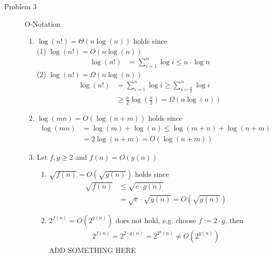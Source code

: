 \documentclass[11pt,a4paper,ngerman]{article}
\begin{document}
\begin{description}
\item[Problem 3] O-Notation
  \begin{enumerate}
    \item $\log(n!) = \Theta(n \log(n))$ holds since\\
          (1) $\log(n!) = O(n \log(n))$ \\
              \begin{equation}\begin{split}
                \log(n!) &= \sum_{i=1}^n {\log i} 
                         \leq n \cdot \log n
              \end{split}\end{equation}
          (2) $\log(n!) = \Omega(n \log(n))$ \\
              \begin{equation}\begin{split}
                \log(n!) &= \sum_{i=1}^n {\log i} \geq \sum_{i=\frac{n}{2}}^n {\log i} \\
                         &\geq \frac{n}{2} \log(\frac{n}{2}) = \Omega(n \log(n))
              \end{split}\end{equation}
    \item $\log(mn) = O(\log(n+m))$ holds since
      \begin{equation}\begin{split}
        \log(mn) &= \log(m) + \log(n) \leq \log(m+n) + \log(n+m)\\
                 &= 2 \log(n+m) = O(\log(n+m))
      \end{split}\end{equation}
  
    \item Let $f,g \geq 2$ and $f(n) = O(g(n))$
    \begin{enumerate}
      \item $\sqrt{f(n)} = O(\sqrt{g(n)})$ holds since
            \begin{equation}\begin{split}
              \sqrt{f(n)} &\leq \sqrt{c\cdot g(n)}\\
                          &= \sqrt{c}\cdot \sqrt{g(n)} = O(\sqrt{g(n)})
            \end{split}\end{equation}
      \item $2^{f(n)} = O(2^{g(n)})$ does not hold, e.g. choose $f := 2\cdot g$, then
            \begin{equation}\begin{split}
              2^{f(n)} = 2^{2\cdot g(n)} = 2^{2^g(n)} \neq O(2^{g(n)})
            \end{split}\end{equation}
            ADD SOMETHING HERE
    \end{enumerate}
  \end{enumerate}

\end{description}

\label{LastPage}
\end{document}
